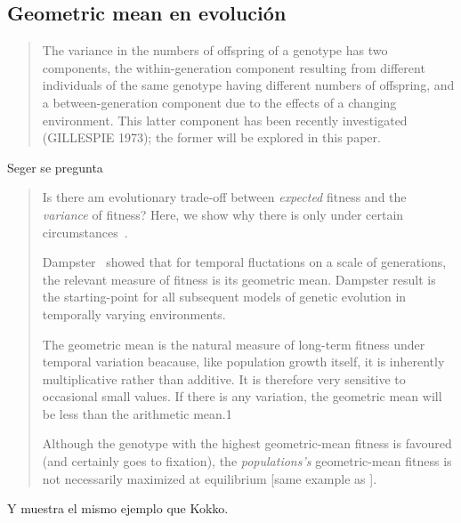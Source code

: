 \documentclass[a4paper,10pt]{article}
\begin{document}
\subsection{Geometric mean en evolución}


\begin{quotation} \cite{gillespie1974-variance}
    The variance in the numbers of offspring of a genotype has two components, the within-generation component resulting from different individuals of the same genotype having different numbers of offspring, and a between-generation component due to the effects of a changing environment.
    This latter component has been recently investigated (GILLESPIE 1973); the former will be explored in this paper.
\end{quotation}


Seger se pregunta
\begin{quotation}
    Is there am evolutionary trade-off between \emph{expected} fitness and the \emph{variance} of fitness?
    Here, we show why there is only under certain circumstances~\cite{seger1987-betHedging}.

    Dampster~\cite{dempster1955-geometricMean} showed that for temporal fluctations on a scale of generations, the relevant measure of fitness is its geometric mean.
    Dampster result is the starting-point for all subsequent models of genetic evolution in temporally varying environments.

    The geometric mean is the natural measure of long-term fitness under temporal variation beacause, like population growth itself, it is inherently multiplicative rather than additive.
    It is therefore very sensitive to occasional small values.
    If there is any variation, the geometric mean will be less than the arithmetic mean.1

    Although the genotype with the highest geometric-mean fitness is favoured (and certainly goes to fixation), the \emph{populations's} geometric-mean fitness is not necessarily maximized at equilibrium [same example as \cite{starrfelt2012-bet}].
\end{quotation}
Y muestra el mismo ejemplo que Kokko.

\\
\end{document}
